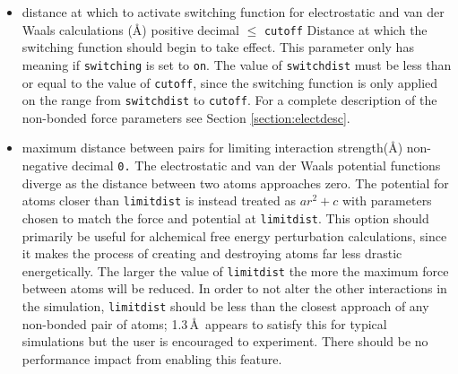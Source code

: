 \begin{itemize}

\item
{}
{distance at which to activate switching function 
for electrostatic and van der Waals calculations (\AA)}
{positive decimal $\leq$ {\tt cutoff}}
{Distance at which the switching function
should begin to take effect.  
This parameter only has meaning if {\tt switching} is 
set to {\tt on}.  
The value of {\tt switchdist} must be less than
or equal to the value of {\tt cutoff}, since the switching function
is only applied on the range from {\tt switchdist} to {\tt cutoff}.  
For a complete description of the non-bonded force parameters see
Section \ref{section:electdesc}.}

\item
{}
{maximum distance between pairs for limiting interaction strength(\AA)}
{non-negative decimal}
{{\tt 0.}}
{
The electrostatic and van der Waals potential functions diverge
as the distance between two atoms approaches zero.
The potential for atoms closer than {\tt limitdist} is instead
treated as $a r^2 + c$ with parameters chosen to match the
force and potential at {\tt limitdist}.
This option should primarily be useful for alchemical free energy
perturbation calculations, since it makes the process of creating
and destroying atoms far less drastic energetically.
The larger the value of {\tt limitdist} the more the maximum force
between atoms will be reduced.
In order to not alter the other interactions in the simulation,
{\tt limitdist} should be less than the closest approach
of any non-bonded pair of atoms; 1.3\,\AA\ appears to satisfy this
for typical simulations but the user is encouraged to experiment.
There should be no performance impact from enabling this feature.
}


\end{itemize}
